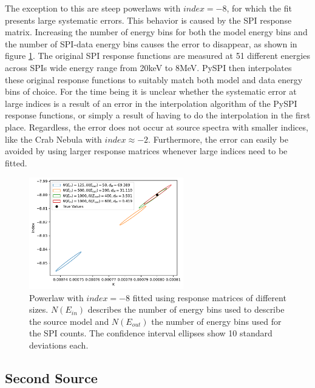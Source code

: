 \documentclass{report}
\begin{document}
The exception to this are steep powerlaws with $index=-8$, for which the fit presents large systematic errors. This behavior is caused by the SPI response matrix. Increasing the number of energy bins for both the model energy bins and the number of SPI-data energy bins causes the error to disappear, as shown in figure \ref{fig large index}. The original SPI response functions are measured at 51 different energies across SPIs wide energy range from 20keV to 8MeV. PySPI then interpolates these original response functions to suitably match both model and data energy bins of choice. For the time being it is unclear whether the systematic error at large indices is a result of an error in the interpolation algorithm of the PySPI response functions, or simply a result of having to do the interpolation in the first place. Regardless, the error does not occur at source spectra with smaller indices, like the Crab Nebula with $index\approx-2$. Furthermore, the error can easily be avoided by using larger response matrices whenever large indices need to be fitted.


\begin{figure}[h]
  \centering
  \includegraphics[width=0.6\textwidth]{Images/Pure_Simulation/large_index_combined_plot_10sig.pdf}
  \caption{Powerlaw with $index=-8$ fitted using response matrices of different sizes. $N(E_{in})$ describes the number of energy bins used to describe the source model and $N(E_{out})$ the number of energy bins used for the SPI counts. The confidence interval ellipses show 10 standard deviations each.}
  \label{fig large index}
\end{figure}


\subsection{Second Source}
\end{document}
